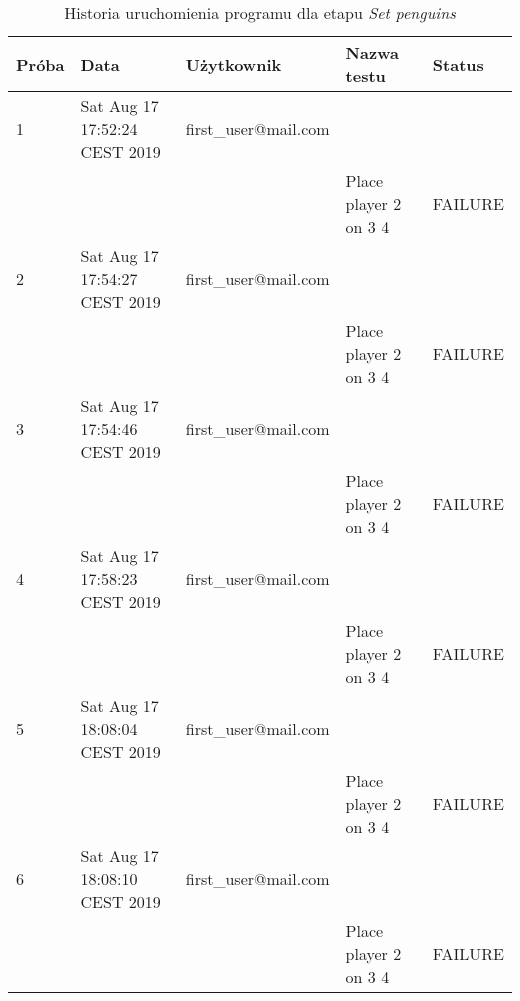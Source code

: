 \scriptsize
\begin{center}
    \begin{longtable}{|l|l|l|l|l|}
        \caption{Historia uruchomienia programu dla etapu \textit{Set penguins}}
        \label{tab:set_penguins} \\\hline
        \hline
        \rowcolor[HTML]{EFEFEF}
        \textbf{Próba} & \textbf{Data}                 & \textbf{Użytkownik}             & \textbf{Nazwa testu}             & \textbf{Status} \\ \hline
         1 &      Sat Aug 17 17:52:24 CEST 2019 & first\_user@mail.com &                                  &                 \\ \hline
         &      &                                 & Place player 2 on 3 4            & FAILURE         \\ \hline
         2 &      Sat Aug 17 17:54:27 CEST 2019 & first\_user@mail.com &                                  &                 \\ \hline
         &      &                                 & Place player 2 on 3 4            & FAILURE         \\ \hline
         3 &      Sat Aug 17 17:54:46 CEST 2019 & first\_user@mail.com &                                  &                 \\ \hline
         &      &                                 & Place player 2 on 3 4            & FAILURE         \\ \hline
         4 &      Sat Aug 17 17:58:23 CEST 2019 & first\_user@mail.com &                                  &                 \\ \hline
         &      &                                 & Place player 2 on 3 4            & FAILURE         \\ \hline
         5 &      Sat Aug 17 18:08:04 CEST 2019 & first\_user@mail.com &                                  &                 \\ \hline
         &      &                                 & Place player 2 on 3 4            & FAILURE         \\ \hline
         6 &      Sat Aug 17 18:08:10 CEST 2019 & first\_user@mail.com &                                  &                 \\ \hline
         &      &                                 & Place player 2 on 3 4            & FAILURE         \\ \hline

\end{longtable}
\end{center}
